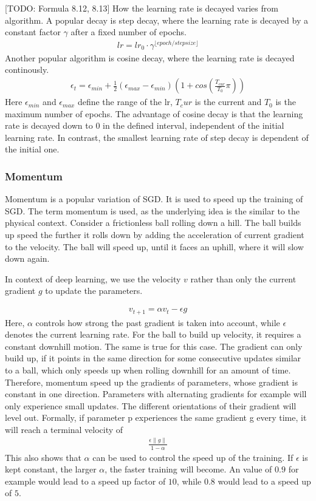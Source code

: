 [TODO: Formula 8.12, 8.13] How the learning rate is decayed varies from
algorithm. A popular decay is step decay, where the learning rate is decayed by
a constant factor $\gamma$ after a fixed number of epochs.
\begin{align}
    lr = lr_0 \cdot \gamma^{\lfloor epoch/stepsize \rfloor}
\end{align}
Another popular algorithm is cosine decay, where the learning rate is decayed
continously.
\begin{align}\label{eq:cosine_decay}
    \epsilon_t = \epsilon_{min} + \frac{1}{2} (\epsilon_{max} - \epsilon_{min})(1+cos(\frac{T_{cur}}{T_0}\pi))
\end{align}
Here $\epsilon_{min}$ and $\epsilon_{max}$ define the range of the lr, $T_cur$
is the current and $T_0$ is the maximum number of epochs. The advantage of
cosine decay is that the learning rate is decayed down to 0 in the defined
interval, independent of the initial learning rate. In contrast, the smallest
learning rate of step decay is dependent of the initial  one.

\subsubsection{Momentum}\label{sub:Momentum}
Momentum is a popular variation of SGD. It is used to speed up the training of
SGD. The term momentum is used, as the underlying idea is the similar to the
physical context. Consider a frictionless ball rolling down a hill. The ball
builds up speed the further it rolls down by adding the acceleration of current
gradient to the velocity. The ball will speed up, until it faces an uphill,
where it will slow down again.

In context of deep learning, we use the velocity $v$ rather than only the
current gradient $g$ to update the parameters.

\begin{align}
    v_{t+1}=\alpha v_t - \epsilon g
\end{align}
Here, $\alpha$ controls how strong the past gradient is taken into account,
while $\epsilon$ denotes the current learning rate. For the ball to build up
velocity, it requires a constant downhill motion. The same is true for this
case. The gradient can only build up, if it points in the same direction for
some consecutive updates similar to a ball, which only speeds up when rolling
downhill for an amount of time. Therefore, momentum speed up the gradients of
parameters, whose gradient is constant in one direction. Parameters with
alternating gradients for example will only experience small updates. The
different orientations of their gradient will level out. Formally, if parameter
p experiences the same gradient g every time, it will reach a terminal velocity
of
\begin{align}
    \frac{\epsilon \lVert g \rVert}{1-\alpha}
\end{align}
This also shows that $\alpha$ can be used to control the speed up of the
training. If $\epsilon$ is kept constant, the larger $\alpha$, the faster
training will become. An value of $0.9$ for example would lead to a speed up
factor of $10$, while $0.8$ would lead to a speed up of $5$.

